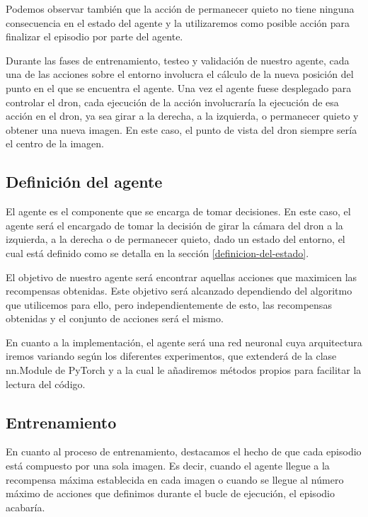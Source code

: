 

Podemos observar también que la acción de permanecer quieto no tiene ninguna consecuencia en el estado del agente y la utilizaremos como posible acción para finalizar el episodio por parte del agente.
\medskip

Durante las fases de entrenamiento, testeo y validación de nuestro agente, cada una de las acciones sobre el entorno involucra el cálculo de la nueva posición del punto en el que se encuentra el agente. Una vez el agente fuese desplegado para controlar el dron, cada ejecución de la acción involucraría la ejecución de esa acción en el dron, ya sea girar a la derecha, a la izquierda, o permanecer quieto y obtener una nueva imagen. En este caso, el punto de vista del dron siempre sería el centro de la imagen.
\medskip

\subsection{Definición del agente}
\label{definicion-del-agente}

El agente es el componente que se encarga de tomar decisiones. En este caso, el agente será el encargado de tomar la decisión de girar la cámara del dron a la izquierda, a la derecha o de permanecer quieto, dado un estado del entorno, el cual está definido como se detalla en la sección \ref{definicion-del-estado}.
\medskip

El objetivo de nuestro agente será encontrar aquellas acciones que maximicen las recompensas obtenidas. Este objetivo será alcanzado dependiendo del algoritmo que utilicemos para ello, pero independientemente de esto, las recompensas obtenidas y el conjunto de acciones será el mismo.
\medskip

En cuanto a la implementación, el agente será una red neuronal cuya arquitectura iremos variando según los diferentes experimentos, que extenderá de la clase nn.Module de PyTorch y a la cual le añadiremos métodos propios para facilitar la lectura del código.


\subsection{Entrenamiento}
\label{entrenamiento}

En cuanto al proceso de entrenamiento, destacamos el hecho de que cada episodio está compuesto por una sola imagen. Es decir, cuando el agente llegue a la recompensa máxima establecida en cada imagen o cuando se llegue al número máximo de acciones que definimos durante el bucle de ejecución, el episodio acabaría. 
\medskip


